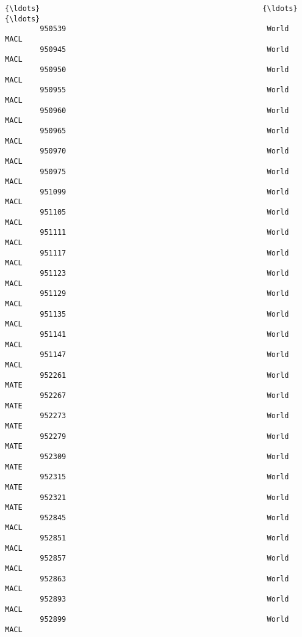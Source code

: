 \documentclass[11pt]{article}
\begin{document}
\begin{Verbatim}[commandchars=\\\{\}]
        {\ldots}                                                   {\ldots}            {\ldots}   
        950539                                              World       MACL       
        950945                                              World       MACL       
        950950                                              World       MACL       
        950955                                              World       MACL       
        950960                                              World       MACL       
        950965                                              World       MACL       
        950970                                              World       MACL       
        950975                                              World       MACL       
        951099                                              World       MACL       
        951105                                              World       MACL       
        951111                                              World       MACL       
        951117                                              World       MACL       
        951123                                              World       MACL       
        951129                                              World       MACL       
        951135                                              World       MACL       
        951141                                              World       MACL       
        951147                                              World       MACL       
        952261                                              World       MATE       
        952267                                              World       MATE       
        952273                                              World       MATE       
        952279                                              World       MATE       
        952309                                              World       MATE       
        952315                                              World       MATE       
        952321                                              World       MATE       
        952845                                              World       MACL       
        952851                                              World       MACL       
        952857                                              World       MACL       
        952863                                              World       MACL       
        952893                                              World       MACL       
        952899                                              World       MACL       
        

\end{Verbatim}
\end{document}
